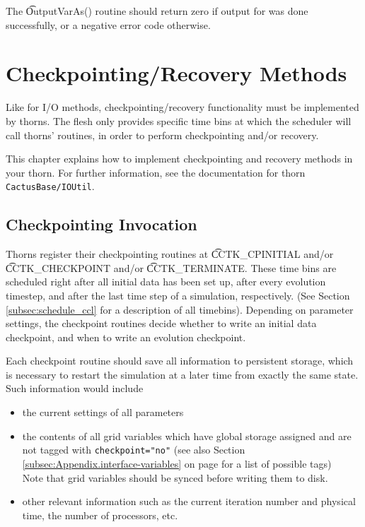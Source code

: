 The {\t OutputVarAs()} routine should return zero if output for
\texttt{}
was done successfully, or a negative error code otherwise.


\section{Checkpointing/Recovery Methods}
\label{chap:cp_recovery_methods}

Like for I/O methods, checkpointing/recovery functionality must be implemented
by thorns. The flesh only provides specific time bins at which the scheduler
will call thorns' routines, in order to perform checkpointing and/or recovery.

This chapter explains how to implement checkpointing and recovery methods
in your thorn.  For further information, see the documentation for thorn
\texttt{CactusBase/IOUtil}.

\subsection{Checkpointing Invocation}

Thorns register their checkpointing routines at {\t CCTK\_CPINITIAL} and/or
{\t CCTK\_CHECKPOINT} and/or {\t CCTK\_TERMINATE}. These time bins are
scheduled right after all initial data has been set up, after every
evolution timestep, and after the last time step of a simulation,
respectively. (See Section \ref{subsec:schedule_ccl} for a description of all timebins).
Depending on
parameter settings, the checkpoint routines decide whether to write an initial
data checkpoint, and when to write an evolution checkpoint.

Each checkpoint routine should save all information to persistent storage, which
is necessary to restart the simulation at a later time from exactly the same
state. Such information would include
%
\begin{itemize}
  \item the current settings of all parameters
  \item the contents of all grid variables which have global storage assigned
    and are not tagged with {\tt checkpoint="no"} (see also Section \ref{subsec:Appendix.interface-variables} on page \pageref{subsec:Appendix.interface-variables} for a list of possible tags)\\
    Note that grid variables should be synced before writing them to disk.
  \item other relevant information such as the current iteration number and
    physical time, the number of processors, etc.
\end{itemize}


